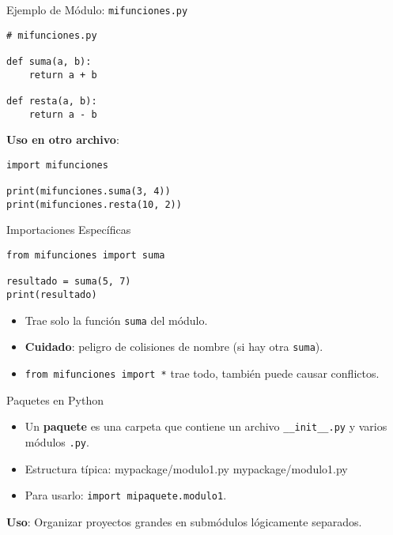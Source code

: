 \documentclass[10pt]{beamer}
\begin{document}
\begin{frame}[fragile]{Ejemplo de Módulo: \texttt{mifunciones.py}}
\begin{verbatim}
# mifunciones.py

def suma(a, b):
    return a + b

def resta(a, b):
    return a - b
\end{verbatim}
\vspace{0.3cm}
\textbf{Uso en otro archivo}:
\begin{verbatim}
import mifunciones

print(mifunciones.suma(3, 4))
print(mifunciones.resta(10, 2))
\end{verbatim}
\end{frame}

\begin{frame}[fragile]{Importaciones Específicas}
\begin{verbatim}
from mifunciones import suma

resultado = suma(5, 7)
print(resultado)
\end{verbatim}
\begin{itemize}
  \item Trae solo la función \texttt{suma} del módulo.
  \item \textbf{Cuidado}: peligro de colisiones de nombre (si hay otra \texttt{suma}).
  \item \texttt{from mifunciones import *} trae todo, también puede causar conflictos.
\end{itemize}
\end{frame}

\begin{frame}{Paquetes en Python}
  \begin{itemize}
    \item Un \textbf{paquete} es una carpeta que contiene un archivo \texttt{\_\_init\_\_.py} y varios módulos \texttt{.py}.
    \item Estructura típica:  mypackage/modulo1.py  mypackage/modulo1.py
    \item Para usarlo: \texttt{import mipaquete.modulo1}.
  \end{itemize}
  \textbf{Uso}: Organizar proyectos grandes en submódulos lógicamente separados.
\end{frame}
\end{document}
